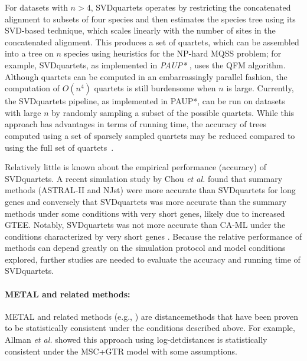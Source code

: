 For datasets with $n>4$, SVDquartets operates by restricting the concatenated alignment to subsets of four species and then estimates the species tree using its SVD-based technique, which scales linearly with the number of sites in the concatenated alignment.
This produces a set of \glspl{quartet}, which can be assembled into a tree on $n$ species using heuristics for the NP-hard \gls{MQSS} problem; for example, SVDquartets, as implemented in \textit{\gls{PAUP*}} \cite{swofford-paup}, uses the \gls{QFM} algorithm.
Although quartets can be computed in an embarrassingly parallel fashion, the computation of  $O(n^4)$ quartets is still burdensome when $n$ is large.
Currently, the SVDquartets pipeline, as implemented in PAUP*, can be run on datasets with large $n$ by randomly sampling a subset of the possible quartets.
While this approach has advantages in terms of running time, the accuracy of trees computed using a set of sparsely sampled quartets may be reduced compared to using the full set of quartets~\cite{swenson2011experimental}.

Relatively little is known about the empirical performance (accuracy) of SVDquartets.
A recent simulation study by Chou {\em et al.} \cite{chou2015comparative} found that summary methods (ASTRAL-II and NJst) were more accurate than SVDquartets for long genes and conversely that SVDquartets was more accurate than the summary methods under some conditions with very short genes, likely due to increased GTEE.
Notably, SVDquartets was not more accurate than CA-ML under the conditions characterized by very short genes \cite{chou2015comparative}.
Because the relative performance of methods can depend greatly on the simulation protocol and model conditions explored, further studies are needed to evaluate the accuracy and running time of SVDquartets.

\paragraph{METAL and related methods:} 
METAL \cite{dasarathy2015data-metal} and related methods (e.g., \cite{allman2019species-logdet}) are \glspl{distancemethod} that have been proven to be statistically consistent under the conditions described above.
For example, Allman {\em et al.} \cite{allman2019species-logdet} showed this approach using \glspl{log-detdistance} is statistically consistent under the MSC+GTR model with some assumptions.
